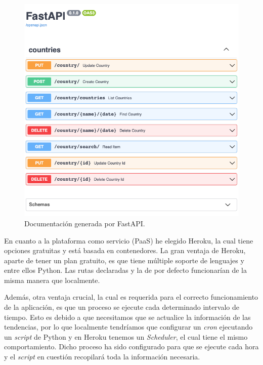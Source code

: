 \begin{figure}[H]
    \centering
    \myfloatalign
    \includegraphics[width=1\textwidth]{gfx/fastapi-rutas.png}
    \caption[Documentación generada por FastAPI]{Documentación generada por FastAPI.}\label{gfx:fastapi-rutas}
\end{figure}

En cuanto a la plataforma como servicio (\ac{PaaS}) he elegido Heroku, la cual tiene opciones gratuitas y está basada en contenedores. La gran ventaja de Heroku, aparte de tener un plan gratuito, es que tiene múltiple soporte de lenguajes y entre ellos Python. Las rutas declaradas y la de por defecto funcionarían de la misma manera que localmente. \cite{heroku-manual}

\vspace{0.3cm}

Además, otra ventaja crucial, la cual es requerida para el correcto funcionamiento de la aplicación, es que un proceso se ejecute cada determinado intervalo de tiempo. Esto es debido a que necesitamos que se actualice la información de las tendencias, por lo que localmente tendríamos que configurar un \textit{cron} ejecutando un \textit{script} de Python y en Heroku tenemos un \textit{Scheduler}, el cual tiene el mismo comportamiento. Dicho proceso ha sido configurado para que se ejecute cada hora y el \textit{script} en cuestión recopilará toda la información necesaria.

